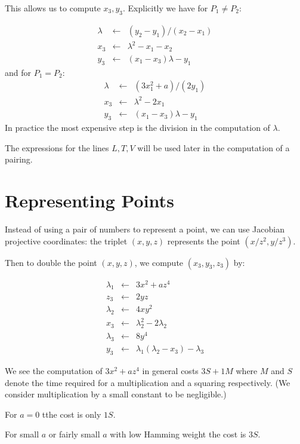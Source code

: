 This allows us to compute $x_3, y_3$. Explicitly we have for $P_1 \ne P_2$:

\[
\begin{array}{rcl}
\lambda &\leftarrow& (y_2 - y_1)/(x_2 - x_1) \\
x_3 &\leftarrow& \lambda^2 - x_1 - x_2 \\
y_3 &\leftarrow& (x_1 - x_3) \lambda - y_1
\end{array}
\]
and for $P_1 = P_2$:
\[
\begin{array}{rcl}
\lambda &\leftarrow& (3x_1^2 + a)/(2y_1) \\
x_3 &\leftarrow& \lambda^2 - 2x_1 \\
y_3 &\leftarrow& (x_1 - x_3) \lambda - y_1
\end{array}
\]
In practice the most expensive step is the division in the computation of
$\lambda$.

The expressions for the lines $L,T,V$ will be used later in the computation
of a pairing.

\section {Representing Points}

Instead of using a pair of numbers to represent a point,
we can use Jacobian projective coordinates: the triplet
$(x,y,z)$ represents the point $(x/z^2, y/z^3)$.

Then to double the point $(x,y,z)$, we compute $(x_3, y_3, z_3)$ by:

\[
\begin{array}{rcl}
\lambda_1 & \leftarrow & 3x^2 + a z^4 \\
z_3 & \leftarrow & 2yz \\
\lambda_2 & \leftarrow & 4xy^2 \\
x_3 & \leftarrow & \lambda_2^2 - 2 \lambda_2 \\
\lambda_3 & \leftarrow & 8 y^4 \\
y_3 & \leftarrow & \lambda_1(\lambda_2 - x_3) - \lambda_3
\end{array}
\]

We see the computation of $3x^2 + a z^4$ in general costs $3S + 1M$
where $M$ and $S$ denote the time required for a multiplication and
a squaring respectively. (We consider multiplication by
a small constant to be negligible.)

For $a=0$ tthe cost is only $1S$.

For small $a$ or fairly small $a$ with low Hamming weight the cost is $3S$.

